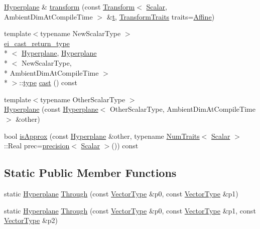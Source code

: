\begin{DoxyCompactItemize}
\item 
\hyperlink{class_hyperplane}{Hyperplane} \& \hyperlink{class_hyperplane_a64585d83cec9f9f9480c986dc585ce8e}{transform} (const \hyperlink{class_transform}{Transform}$<$ \hyperlink{class_hyperplane_a7aa8093dff10cabfce189f280fb14069}{Scalar}, Ambient\-Dim\-At\-Compile\-Time $>$ \&\hyperlink{glext_8h_a00140d6f5c548b26daf170bf16e86a6d}{t}, \hyperlink{_transform_8h_a302a826315506a7217d4b477ea78425f}{Transform\-Traits} traits=\hyperlink{_transform_8h_a302a826315506a7217d4b477ea78425fac0984f0c0fc7cdcea1c0bde170f9c925}{Affine})
\item 
{\footnotesize template$<$typename New\-Scalar\-Type $>$ }\\\hyperlink{structei__cast__return__type}{ei\-\_\-cast\-\_\-return\-\_\-type}\\*
$<$ \hyperlink{class_hyperplane}{Hyperplane}, \hyperlink{class_hyperplane}{Hyperplane}\\*
$<$ New\-Scalar\-Type, \\*
Ambient\-Dim\-At\-Compile\-Time $>$\\*
 $>$\-::\hyperlink{glext_8h_a7d05960f4f1c1b11f3177dc963a45d86}{type} \hyperlink{class_hyperplane_a938863707d6218a51525ab0733d98728}{cast} () const 
\item 
{\footnotesize template$<$typename Other\-Scalar\-Type $>$ }\\\hyperlink{class_hyperplane_a6225bf4647cb5cc7f31ac91b1eb21d8b}{Hyperplane} (const \hyperlink{class_hyperplane}{Hyperplane}$<$ Other\-Scalar\-Type, Ambient\-Dim\-At\-Compile\-Time $>$ \&other)
\item 
bool \hyperlink{class_hyperplane_a5b7cbb56f2687b2666e7f3541b3632a2}{is\-Approx} (const \hyperlink{class_hyperplane}{Hyperplane} \&other, typename \hyperlink{struct_num_traits}{Num\-Traits}$<$ \hyperlink{class_hyperplane_a7aa8093dff10cabfce189f280fb14069}{Scalar} $>$\-::Real prec=\hyperlink{_math_functions_8h_a3dc1c65cf9dc9b5a7ee66472d0ae83e1}{precision}$<$ \hyperlink{class_hyperplane_a7aa8093dff10cabfce189f280fb14069}{Scalar} $>$()) const 
\end{DoxyCompactItemize}
\subsection*{Static Public Member Functions}
\begin{DoxyCompactItemize}
\item 
static \hyperlink{class_hyperplane}{Hyperplane} \hyperlink{class_hyperplane_aa1b08f260f6a00f77940e05774a541e3}{Through} (const \hyperlink{class_hyperplane_ae700a24e287a31cece3618e1e1bc6385}{Vector\-Type} \&p0, const \hyperlink{class_hyperplane_ae700a24e287a31cece3618e1e1bc6385}{Vector\-Type} \&p1)
\item 
static \hyperlink{class_hyperplane}{Hyperplane} \hyperlink{class_hyperplane_afbae06656ee6cbe4c23640bdba0f3a32}{Through} (const \hyperlink{class_hyperplane_ae700a24e287a31cece3618e1e1bc6385}{Vector\-Type} \&p0, const \hyperlink{class_hyperplane_ae700a24e287a31cece3618e1e1bc6385}{Vector\-Type} \&p1, const \hyperlink{class_hyperplane_ae700a24e287a31cece3618e1e1bc6385}{Vector\-Type} \&p2)
\end{DoxyCompactItemize}
